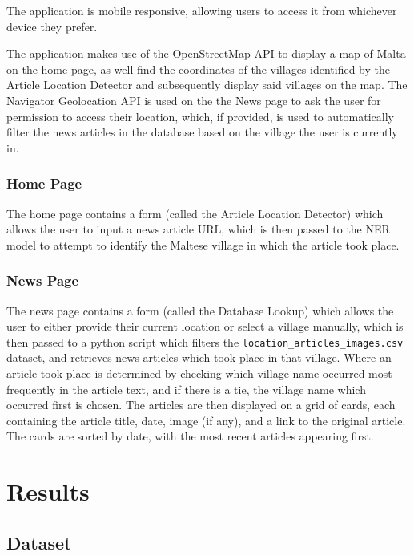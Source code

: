 \documentclass[a4paper, oneside, 11pt]{article}
\begin{document}
\begin{multicols*}{2}
  The application is mobile responsive, allowing users to access it from whichever device they prefer.
  
  The application makes use of the \href{https://www.openstreetmap.org/}{OpenStreetMap} API to display a map of Malta on the home page, as well find the coordinates of the villages identified by the Article Location Detector and subsequently display said villages on the map. The Navigator Geolocation API is used on the the News page to ask the user for permission to access their location, which, if provided, is used to automatically filter the news articles in the database based on the village the user is currently in.

  \subsubsection{Home Page} 
  The home page contains a form (called the Article Location Detector) which allows the user to input a news article URL, which is then passed to the NER model to attempt to identify the Maltese village in which the article took place.

  \subsubsection{News Page}
  The news page contains a form (called the Database Lookup) which allows the user to either provide their current location or select a village manually, which is then passed to a python script which filters the \verb|location_articles_images.csv| dataset, and retrieves news articles which took place in that village. Where an article took place is determined by checking which village name occurred most frequently in the article text, and if there is a tie, the village name which occurred first is chosen. The articles are then displayed on a grid of cards, each containing the article title, date, image (if any), and a link to the original article. The cards are sorted by date, with the most recent articles appearing first.

  
  \section{Results}
  \subsection{Dataset}



\end{multicols*}
\end{document}
